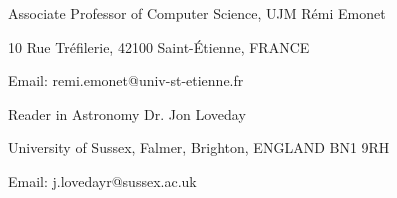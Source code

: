\begin{multicols}{2}
\begin{cventries}
	\cventry
	{Associate Professor of Computer Science, UJM}
	{R\'{e}mi Emonet}
	{}
	{}
	{
		\begin{cvitems}
			\item {10 Rue Tréfilerie, 42100 Saint-Étienne, FRANCE}
			\item{Email: remi.emonet@univ-st-etienne.fr}
		\end{cvitems}
	}
	\newline
	\newline
	\cventry
	{Reader in Astronomy}
	{Dr. Jon Loveday}
	{}
	{}
	{
		\begin{cvitems}
			\item {University of Sussex, Falmer, Brighton, ENGLAND BN1 9RH}
			\item{Email: j.lovedayr@sussex.ac.uk}
		\end{cvitems}
	}

\end{cventries}

\end{multicols}
